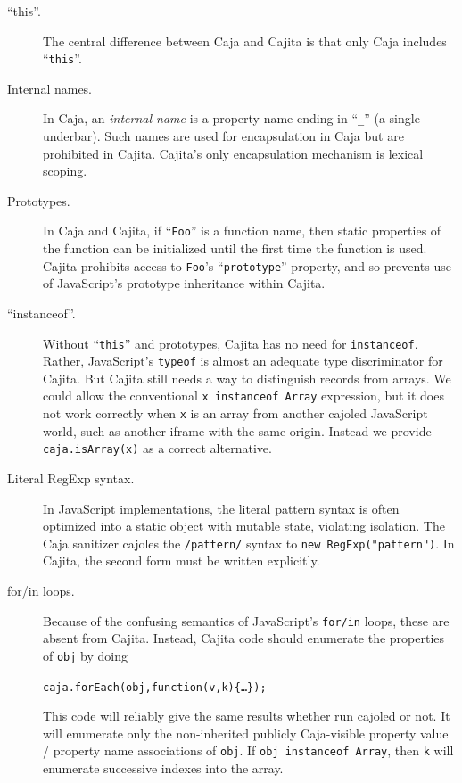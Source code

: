 \documentclass[letterpaper,twocolumn,10pt]{article}
\newcommand{\code}[1]{{\tt {#1}}}              %
\begin{document}
\begin{description}
    
    \item[``this''.] The central difference between Caja and Cajita is that only Caja includes ``\code{this}''.
    
    \item[Internal names.] In Caja, an \emph{internal name} is a property name ending in ``\code{\_}'' (a single 
    underbar). Such names are used for encapsulation in Caja but are prohibited in Cajita. Cajita's only 
    encapsulation mechanism is lexical scoping.
    
    \item[Prototypes.] In Caja and Cajita, if ``\code{Foo}'' is a function name, then static properties of the 
    function can be initialized until the first time the function is used. Cajita prohibits access to \code{Foo}'s 
    ``\code{prototype}'' property, and so prevents use of JavaScript's prototype inheritance within Cajita.
    
    \item[``instanceof''.] Without ``\code{this}'' and prototypes, Cajita has no need for \code{instanceof}. Rather, 
    JavaScript's \code{typeof} is almost an adequate type discriminator for Cajita. But Cajita still needs a way to 
    distinguish records from arrays. We could allow the conventional \code{x instanceof Array} expression, but it 
    does not work correctly when \code{x} is an array from another cajoled JavaScript world, such as another iframe 
    with the same origin. Instead we provide \code{caja.isArray(x)} as a correct alternative.
    
    \item[Literal RegExp syntax.] In JavaScript implementations, the literal pattern syntax is often optimized into a 
    static object with mutable state, violating isolation. The Caja sanitizer cajoles the \code{/pattern/} syntax to 
    \code{new RegExp("pattern")}. In Cajita, the second form must be written explicitly.
    
    \item[for/in loops.] Because of the confusing semantics of JavaScript's \code{for/in} loops, these are absent 
    from Cajita. Instead, Cajita code should enumerate the properties of \code{obj} by doing
%
\begin{alltt}caja.forEach(obj,function(v,k)\{{\ldots}\});\end{alltt}
%
    This code will reliably give the same results whether run cajoled or not. It will enumerate only the 
    non-inherited publicly Caja-visible property value / property name associations of \code{obj}. If \code{obj 
    instanceof Array}, then \code{k} will enumerate successive indexes into the array.
    

\end{description}
\end{document}
